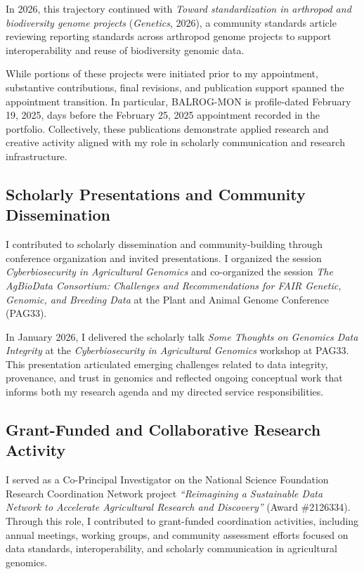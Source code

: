 In 2026, this trajectory continued with \textit{Toward standardization in arthropod and biodiversity genome projects} (\textit{Genetics}, 2026), a community standards article reviewing reporting standards across arthropod genome projects to support interoperability and reuse of biodiversity genomic data.

While portions of these projects were initiated prior to my appointment, substantive contributions, final revisions, and publication support spanned the appointment transition. In particular, BALROG-MON is profile-dated February 19, 2025, days before the February 25, 2025 appointment recorded in the portfolio. Collectively, these publications demonstrate applied research and creative activity aligned with my role in scholarly communication and research infrastructure.

\subsection*{Scholarly Presentations and Community Dissemination}

I contributed to scholarly dissemination and community-building through conference organization and invited presentations. I organized the session \textit{Cyberbiosecurity in Agricultural Genomics} and co-organized the session \textit{The AgBioData Consortium: Challenges and Recommendations for FAIR Genetic, Genomic, and Breeding Data} at the Plant and Animal Genome Conference (PAG33).

In January 2026, I delivered the scholarly talk \textit{Some Thoughts on Genomics Data Integrity} at the \textit{Cyberbiosecurity in Agricultural Genomics} workshop at PAG33. This presentation articulated emerging challenges related to data integrity, provenance, and trust in genomics and reflected ongoing conceptual work that informs both my research agenda and my directed service responsibilities.

\subsection*{Grant-Funded and Collaborative Research Activity}

I served as a Co-Principal Investigator on the National Science Foundation Research Coordination Network project \textit{``Reimagining a Sustainable Data Network to Accelerate Agricultural Research and Discovery''} (Award \#2126334). Through this role, I contributed to grant-funded coordination activities, including annual meetings, working groups, and community assessment efforts focused on data standards, interoperability, and scholarly communication in agricultural genomics.

